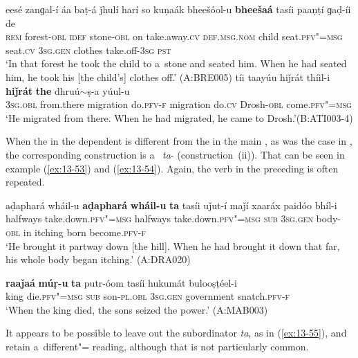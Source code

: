 \ea
\label{ex:13-51}
\gll eesé zanɡal-í áa baṭ-á ǰhulí harí so kuṇaák bheešóol-u \textbf{bheešaá} tasíi paaṇṭí ɡaḍ-íi de \\
\textsc{rem} forest-\textsc{obl} \textsc{idef} stone-\textsc{obl} on take.away.\textsc{cv}   \textsc{def.msg.nom} child seat.\textsc{pfv"=msg} seat.\textsc{cv} \textsc{3sg.gen} clothes take.off-\textsc{3sg} \textsc{pst}\\
\glt `In that forest he took the child to a~stone and seated him. When he had seated him, he took his [the child's] clothes off.' (A:BRE005)
\ex
\label{ex:13-52}
\gll tíi taayúu hiǰrát thíil-i \textbf{hiǰrát} \textbf{the} dhruú$\sim$ṣ-a yúul-u\\
\textsc{3sg.obl} from.there migration do.\textsc{pfv-f} migration do.\textsc{cv} Drosh-\textsc{obl} come.\textsc{pfv"=msg}\\
\glt `He migrated from there. When he had migrated, he came to Drosh.'\newline (B:ATI003-4) 
\z

When the  in the dependent  is different from the  in the main , as was the case in , the corresponding construction is a~ \textit{ta}- (construction~(ii)). That can be seen in example (\ref{ex:13-53}) and (\ref{ex:13-54}). Again, the verb in the preceding   is often repeated.

\largerpage
\begin{exe}
\ex
\label{ex:13-53}
\gll aḍaphará wháil-u \textbf{aḍaphará} \textbf{wháil-u} \textbf{ta} tasíi uǰut-í maǰí xaaráx paidóo bhíl-i \\
halfways take.down.\textsc{pfv"=msg} halfways  take.down.\textsc{pfv"=msg } \textsc{sub} \textsc{3sg.gen} body-\textsc{obl} in itching born become.\textsc{pfv-f} \\
\glt `He brought it partway down [the hill]. When he had brought it down that far, his whole body began itching.' (A:DRA020)

\ex
\label{ex:13-54}
\gll \textbf{raaǰaá} \textbf{múṛ-u} \textbf{ta} putr-óom tasíi hukumát bulooṣṭéel-i \\
king die.\textsc{pfv"=msg} \textsc{sub} son-\textsc{pl.obl} \textsc{3sg.gen}  government snatch.\textsc{pfv-f} \\
\glt `When the king died, the sons seized the power.' (A:MAB003)
\end{exe}

It appears to be possible to leave out the subordinator \textit{ta}, as in (\ref{ex:13-55}), and retain a~different"= reading, although that is not particularly common.

